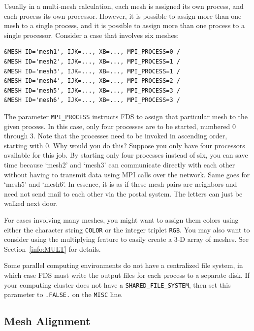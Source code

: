 \documentclass[11pt]{book}
\newcommand{\ct}{\tt\small}
\begin{document}
Usually in a multi-mesh calculation, each mesh is assigned its own process, and each process its own processor. However, it is possible to assign more than one
mesh to a single process, and it is possible to assign more than one process to a single processor. Consider a case that involves six meshes:

\footnotesize
\begin{verbatim}
&MESH ID='mesh1', IJK=..., XB=..., MPI_PROCESS=0 /
&MESH ID='mesh2', IJK=..., XB=..., MPI_PROCESS=1 /
&MESH ID='mesh3', IJK=..., XB=..., MPI_PROCESS=1 /
&MESH ID='mesh4', IJK=..., XB=..., MPI_PROCESS=2 /
&MESH ID='mesh5', IJK=..., XB=..., MPI_PROCESS=3 /
&MESH ID='mesh6', IJK=..., XB=..., MPI_PROCESS=3 /
\end{verbatim} \normalsize

\noindent
The parameter {\ct MPI\_PROCESS} instructs FDS to assign that particular mesh to the given process. In this case, only four processes are to be started, numbered
0 through 3. Note that the processes need to be invoked in ascending order, starting with 0. Why would you do this?
Suppose you only have four processors available for this
job. By starting only four processes instead of six, you can save time because `mesh2' and `mesh3'
can communicate directly with each other without having to transmit data
using MPI calls over the network. Same goes for `mesh5' and `mesh6'.
In essence, it is as if these mesh pairs are neighbors and need not send mail to each other via the postal system. The letters can just be
walked next door.

For cases involving many meshes, you might want to assign them colors using either the character string {\ct COLOR} or the integer triplet {\ct RGB}. You may also
want to consider using the multiplying feature to easily create a 3-D array of meshes. See Section~\ref{info:MULT} for details.

Some parallel computing environments do not have a centralized file system, in which case FDS must write the output files for each process to a separate disk. If
your computing cluster does not have a {\ct SHARED\_FILE\_SYSTEM}, then set this parameter to {\ct .FALSE.} on the {\ct MISC} line.


\subsection{Mesh Alignment}
\end{document}
